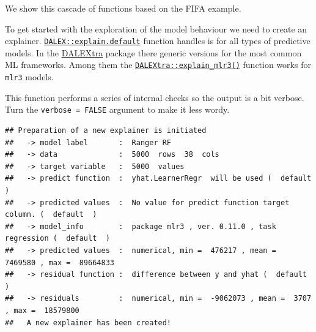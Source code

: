 \documentclass[
]{scrbook}
\newenvironment{Shaded}{\begin{snugshade}}{\end{snugshade}}
\newcommand{\AttributeTok}[1]{\textcolor[rgb]{0.77,0.63,0.00}{#1}}
\newcommand{\ConstantTok}[1]{\textcolor[rgb]{0.00,0.00,0.00}{#1}}
\newcommand{\FunctionTok}[1]{\textcolor[rgb]{0.00,0.00,0.00}{#1}}
\newcommand{\NormalTok}[1]{#1}
\newcommand{\OtherTok}[1]{\textcolor[rgb]{0.56,0.35,0.01}{#1}}
\newcommand{\SpecialCharTok}[1]{\textcolor[rgb]{0.00,0.00,0.00}{#1}}
\newcommand{\StringTok}[1]{\textcolor[rgb]{0.31,0.60,0.02}{#1}}
\renewenvironment{Shaded} {\begin{snugshade}\small} {\end{snugshade}}
\begin{document}
We show this cascade of functions based on the FIFA example.

To get started with the exploration of the model behaviour we need to create an explainer. \href{https://www.rdocumentation.org/packages/DALEX/topics/explain.default}{\texttt{DALEX::explain.default}} function handles is for all types of predictive models. In the \href{https://cran.r-project.org/package=DALEXtra}{DALEXtra} package there generic versions for the most common ML frameworks. Among them the \href{https://www.rdocumentation.org/packages/DALEXtra/topics/explain_mlr3}{\texttt{DALEXtra::explain\_mlr3()}} function works for \texttt{mlr3} models.

This function performs a series of internal checks so the output is a bit verbose. Turn the \texttt{verbose\ =\ FALSE} argument to make it less wordy.

\begin{Shaded}
\end{Shaded}

\begin{verbatim}
## Preparation of a new explainer is initiated
##   -> model label       :  Ranger RF 
##   -> data              :  5000  rows  38  cols 
##   -> target variable   :  5000  values 
##   -> predict function  :  yhat.LearnerRegr  will be used (  default  )
##   -> predicted values  :  No value for predict function target column. (  default  )
##   -> model_info        :  package mlr3 , ver. 0.11.0 , task regression (  default  ) 
##   -> predicted values  :  numerical, min =  476217 , mean =  7469580 , max =  89664833  
##   -> residual function :  difference between y and yhat (  default  )
##   -> residuals         :  numerical, min =  -9062073 , mean =  3707 , max =  18579800  
##   A new explainer has been created!
\end{verbatim}
\end{document}
